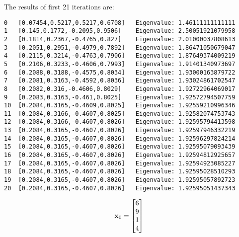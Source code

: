 \documentclass{article}
\begin{document}
\begin{enumerate}
The results of first 21 iterations are: 
\begin{verbatim}
0	[0.07454,0.5217,0.5217,0.6708]	 Eigenvalue: 1.46111111111111
1	[0.145,0.1772,-0.2095,0.9506]	 Eigenvalue: 2.50051921079958
2	[0.1814,0.2367,-0.4765,0.827]	 Eigenvalue: 2.01000037808613
3	[0.2051,0.2951,-0.4979,0.7892]	 Eigenvalue: 1.86471050679047
4	[0.2115,0.3214,-0.4763,0.7906]	 Eigenvalue: 1.87649374009219
5	[0.2106,0.3233,-0.4606,0.7993]	 Eigenvalue: 1.91401340973697
6	[0.2088,0.3188,-0.4575,0.8034]	 Eigenvalue: 1.93000163879722
7	[0.2081,0.3163,-0.4592,0.8036]	 Eigenvalue: 1.93024861702547
8	[0.2082,0.316,-0.4606,0.8029]	 Eigenvalue: 1.92722964069017
9	[0.2083,0.3163,-0.461,0.8025]	 Eigenvalue: 1.92572794507759
10	[0.2084,0.3165,-0.4609,0.8025]	 Eigenvalue: 1.92559210996346
11	[0.2084,0.3166,-0.4607,0.8025]	 Eigenvalue: 1.92582074753743
12	[0.2084,0.3166,-0.4607,0.8026]	 Eigenvalue: 1.92595794413598
13	[0.2084,0.3165,-0.4607,0.8026]	 Eigenvalue: 1.92597946332219
14	[0.2084,0.3165,-0.4607,0.8026]	 Eigenvalue: 1.92596297824214
15	[0.2084,0.3165,-0.4607,0.8026]	 Eigenvalue: 1.92595079093439
16	[0.2084,0.3165,-0.4607,0.8026]	 Eigenvalue: 1.92594812925657
17	[0.2084,0.3165,-0.4607,0.8026]	 Eigenvalue: 1.92594923085227
18	[0.2084,0.3165,-0.4607,0.8026]	 Eigenvalue: 1.92595028510293
19	[0.2084,0.3165,-0.4607,0.8026]	 Eigenvalue: 1.92595057892723
20	[0.2084,0.3165,-0.4607,0.8026]	 Eigenvalue: 1.92595051437343
\end{verbatim}


\begin{align}
\boldsymbol{\mathrm{x}}_0=\begin{bmatrix} 6 \\ 9 \\ 1\\ 4 \end{bmatrix}
\end{align}


\end{enumerate}
\end{document}
